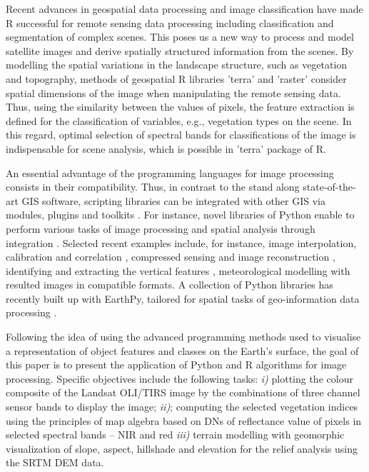 \documentclass[algorithms,article,submit,pdftex,moreauthors]{Definitions/mdpi}
\begin{document}
Recent advances in geospatial data processing \cite{8226275} and image classification \cite{9844952,8117873} have made R successful for remote sensing data processing including classification and segmentation of complex scenes. This poses us a new way to process and model satellite images and derive spatially structured information from the scenes. By modelling the spatial variations in the landscape structure, such as vegetation and topography, methods of geospatial R libraries 'terra' and 'raster' consider spatial dimensions of the image when manipulating the remote sensing data. Thus, using the similarity between the values of pixels, the feature extraction is defined for the classification of variables, e.g., vegetation types on the scene. In this regard, optimal selection of spectral bands for classifications of the image is indispensable for scene analysis, which is possible in 'terra' package of R. 

An essential advantage of the programming languages for image processing consists in their compatibility. Thus, in contrast to the stand along state-of-the-art GIS software, scripting libraries can be integrated with other GIS via modules, plugins and toolkits \cite{6407912,7378577,VOS2019104528}. For instance, novel libraries of Python enable to perform various tasks of image processing and spatial analysis through integration \cite{1247428,Rey2010PySALAP,Rey2010}. Selected recent examples include, for instance, image interpolation, calibration and correlation \cite{DEDEUSFILHO2022101131}, compressed sensing and image reconstruction \cite{FARRENS2020100402}, identifying and extracting the vertical features \cite{GAO2022105503}, meteorological modelling \cite{6528254} with resulted images in compatible formats. A collection of Python libraries \cite{ROBERTS2022105192,CHEN2022105362} has recently built up with EarthPy, tailored for spatial tasks of geo-information data processing \cite{wasser2019EarthPyAP}. 

Following the idea of using the advanced programming methods used to visualise a representation of object features and classes on the Earth's surface, the goal of this paper is to present the application of Python and R algorithms for image processing. Specific objectives include the following tasks: \emph{i)} plotting the colour composite of the Landsat OLI/TIRS  image by the combinations of three channel sensor bands to display the image; \emph{ii)}; computing the selected vegetation indices using the principles of map algebra based on DNs of reflectance value of pixels in selected spectral bands -- NIR and red \emph{iii)} 
terrain modelling with geomorphic visualization of slope, aspect, hillshade and elevation for the relief analysis using the SRTM DEM data. 
\end{document}
